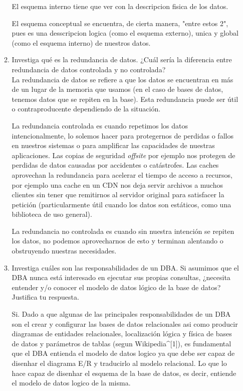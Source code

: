\documentclass[12pt,a4paper]{article}
\begin{document}
\begin{enumerate}
\begin{enumerate}
				El esquema interno tiene que ver con la descripcion fisica de los datos.
				
				El esquema conceptual se encuentra, de cierta manera, "entre estos 2", pues es una desscripcion logica 
				(como el esquema externo), unica y global (como el esquema interno) de nuestros datos.

			\item Investiga qué es la redundancia de datos. ¿Cuál sería la diferencia entre redundancia de datos
				controlada y no controlada?\\

				La redundancia de datos se refiere a que los datos se encuentran en más de un lugar de
				la memoria que usamos (en el caso de bases de datos, tenemos datos que se repiten en la base).
				Esta redundancia puede ser útil o contraproducente dependiendo de la situación.

				La redundancia controlada es cuando repetimos los datos intencionalmente, lo solemos
				hacer para protegernos de perdidas o fallos en nuestros sistemas o para amplificar las
				capacidades de nuestras aplicaciones.
				Las copias de seguridad \textit{offsite} por ejemplo nos protegen de perdidas de datos
				causadas por accidentes o catástrofes.
				Las caches aprovechan la redundancia para acelerar el tiempo de acceso a recursos,
				por ejemplo una cache en un CDN nos deja servir archivos a muchos clientes sin
				tener que remitirnos al servidor original para satisfacer la petición
				(particularmente útil cuando los datos son estáticos, como una biblioteca de uso general).

				La redundancia no controlada es cuando sin nuestra intención se repiten los datos,
				no podemos aprovecharnos de esto y terminan alentando o obstruyendo nuestras necesidades.

			\item Investiga cuáles son las responsabilidades de un DBA. Si asumimos que el DBA nunca está interesado
				en ejecutar sus propias consultas, ¿necesita entender y/o conocer el modelo de datos lógico de la
				base de datos? Justifica tu respuesta.

				Si. Dado a que algunas de las principales responsabilidades de un DBA son el crear y configurar las bases de datos 
				relacionales asi como producir diagramas de entidades relacionales, localización lógica y física de bases de datos y 
				parámetros de tablas (segun Wikipedia^[1]), es fundamental que el DBA entienda el modelo de datos logico ya que debe ser
				capaz de disenhar el diagrama E/R y traducirlo al modelo relacional. Lo que lo hace capaz de disenhar el esquema de la 
				base de datos, es decir, entiende el modelo de datos logico de la misma.


\end{enumerate}
\end{enumerate}
\end{document}
